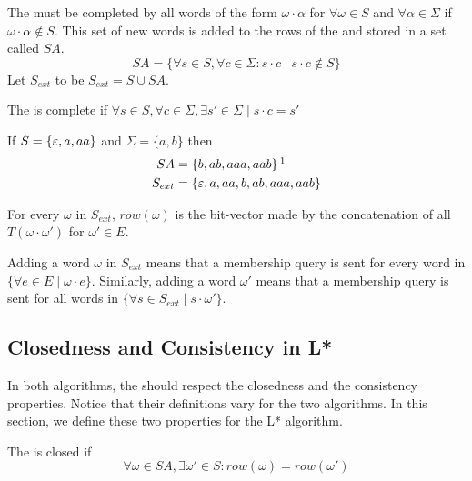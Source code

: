 The \OT must be completed by all words of the form $\omega \cdot \alpha$ for $\forall \omega \in S$ and $\forall \alpha \in \Sigma$ if $\omega \cdot \alpha \notin S$. This set of new words is added to the rows of the \OT and stored in a set called $SA$.
\[SA = \{\forall s \in S, \forall c \in \Sigma: s \cdot c \mid s \cdot c \notin S \} \]
Let $S_{ext}$ to be $S_{ext} = S \cup SA$.

\begin{definition}[Completeness]
  The \OT is complete if $\forall s \in S, \forall c \in \Sigma, \exists s' \in \Sigma \mid s \cdot c = s'$
\end{definition}

\begin{example}
  If $S = \{\varepsilon, a, aa\}$ and $\Sigma = \{a, b\}$ then
  \begin{align*}
    SA      & = \left\{ b, ab, aaa, aab \right\}\footnotemark{}
    \\
    S_{ext} & = \left\{\E, a, aa, b, ab, aaa, aab\right\}
  \end{align*}
\end{example}


\begin{notation}
  For every $\omega$ in $S_{ext}$, $row(\omega)$ is the bit-vector made by the concatenation of all $T(\omega \cdot \omega')$ for $\omega' \in E$.
\end{notation}

\begin{remark}
  Adding a word $\omega$ in $S_{ext}$ means that a membership query is sent for every word in $\{\forall e \in E \mid \omega \cdot e\}$. Similarly, adding a word $\omega'$ means that a membership query is sent for all words in $\{\forall s \in S_{ext} \mid s \cdot \omega'\}$.
\end{remark}

\subsection{Closedness and Consistency in L*}

In both algorithms, the \OT should respect the closedness and the consistency properties. Notice that their definitions vary for the two algorithms. In this section, we define these two properties for the L* algorithm.

\begin{definition}[Closedness]
  The \OT is closed if
  \[\forall \omega \in SA, \exists \omega' \in S: row(\omega) = row(\omega')\]
\end{definition}


